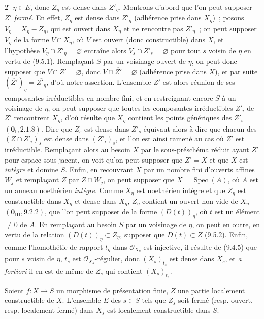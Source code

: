 
$2^\circ$ $\eta\in E$, donc $Z_\eta$ est dense dans $Z'_\eta$. Montrons
d'abord que l'on peut supposer $Z'$ \emph{fermé}. En effet, $Z_\eta$ est dense
dans $\overline{Z'_\eta}$ (adhérence prise dans $X_\eta$)~; posons
$V_\eta=X_\eta-\overline{Z_\eta}$, qui est ouvert dans $X_\eta$ et ne
rencontre pas $Z'_\eta$~; on peut supposer $V_\eta$ de la forme $V\cap X_\eta$,
où $V$ est ouvert (donc constructible) dans $X$, et l'hypothèse
$V_\eta\cap Z'_\eta=\varnothing$ entraîne alors
$V_s\cap Z'_s=\varnothing$ pour tout $s$ voisin de $\eta$ en vertu de (9.5.1).
Remplaçant $S$ par un voisinage ouvert de $\eta$, on peut donc supposer que
$V\cap Z'=\varnothing$, donc $V\cap\overline{Z'}=\varnothing$ (adhérence prise
dans $X$), et par suite $(\overline{Z'})_\eta=\overline{Z'_\eta}$, d'où notre
assertion. L'ensemble $Z'$ est alors réunion de ses composantes irréductibles
en nombre fini, et en restreignant encore $S$ à un voisinage de $\eta$, on
peut supposer que toutes les composantes irréductibles $Z'_i$ de $Z'$
rencontrent $X_\eta$, d'où résulte que $X_\eta$ contient les points génériques
des $Z'_i$ $(\mathbf 0_{\mathrm I},2.1.8)$. Dire que $Z_s$ est dense dans
$Z'_s$ équivaut alors à dire que chacun des $(Z\cap Z'_i)_s$ est dense dans
$(Z'_i)_s$, et l'on est ainsi ramené au cas où $Z'$ est irréductible.
Remplaçant alors au besoin $X$ par le sous-préschéma réduit ayant $Z'$ pour
espace sous-jacent, on voit qu'on peut supposer que $Z'=X$ et que $X$ est
\emph{intègre} et domine $S$. Enfin, en recouvrant $X$ par un nombre fini
d'ouverts affines $W_j$ et remplaçant $Z$ par $Z\cap W_j$, on peut supposer
que $X=\operatorname{Spec}(A)$, où $A$ est un anneau noethérien \emph{intègre}.
Comme $X_\eta$ est noethérien intègre et que $Z_\eta$ est constructible dans
$X_\eta$ et dense dans $X_\eta$, $Z_\eta$ contient un ouvert non vide de
$X_\eta$ $(\mathbf 0_{\mathrm{III}},9.2.2)$, que l'on peut supposer de la forme
$(D(t))_\eta$, où $t$ est un élément $\neq0$ de $A$. En remplaçant au besoin
$S$ par un voisinage de $\eta$, on peut en outre, en vertu de la relation
$(D(t))_\eta\subset Z_\eta$, supposer que $D(t)\subset Z$ (9.5.2). Enfin,
comme l'homothétie de rapport $t_\eta$ dans $\mathcal O_{X_\eta}$ est
injective, il résulte de (9.4.5) que pour $s$ voisin de $\eta$, $t_s$ est
$\mathcal O_{X_s}$-régulier, donc $(X_s)_{t_s}$ est dense dans $X_s$, et
\emph{a fortiori} il en est de même de $Z_s$ qui contient $(X_s)_{t_s}$.

\begin{corollary}[9.5.4]
\label{IV.9.5.4-fr}
Soient $f:X\to S$ un morphisme de présentation finie, $Z$ une partie
localement constructible de $X$. L'ensemble $E$ des $s\in S$ tels que $Z_s$
soit fermé \textnormal{(}resp. ouvert, resp. localement fermé\textnormal{)}
dans $X_s$ est localement constructible dans $S$.
\end{corollary}

